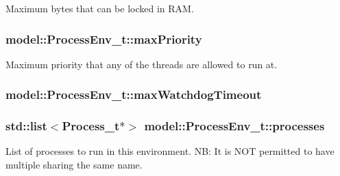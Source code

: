 Maximum bytes that can be locked in R\+AM. 

\subsubsection[{\texorpdfstring{max\+Priority}{maxPriority}}]{ model\+::\+Process\+Env\+\_\+t\+::max\+Priority\hspace{0.3cm}{\ttfamily [private]}}\hypertarget{structmodel_1_1_process_env__t_a87af9ee041287c17fd4ae17db4e319ec}{}\label{structmodel_1_1_process_env__t_a87af9ee041287c17fd4ae17db4e319ec}


Maximum priority that any of the threads are allowed to run at. 

\subsubsection[{\texorpdfstring{max\+Watchdog\+Timeout}{maxWatchdogTimeout}}]{ model\+::\+Process\+Env\+\_\+t\+::max\+Watchdog\+Timeout}\hypertarget{structmodel_1_1_process_env__t_ad9cba2e832253c123b43ff047dd17f40}{}\label{structmodel_1_1_process_env__t_ad9cba2e832253c123b43ff047dd17f40}
\subsubsection[{\texorpdfstring{processes}{processes}}]{\setlength{\rightskip}{0pt plus 5cm}std\+::list$<${\bf Process\+\_\+t}$\ast$$>$ model\+::\+Process\+Env\+\_\+t\+::processes}\hypertarget{structmodel_1_1_process_env__t_aaf3939d50131cc261c01599ed6ba15f8}{}\label{structmodel_1_1_process_env__t_aaf3939d50131cc261c01599ed6ba15f8}
List of processes to run in this environment. NB\+: It is N\+OT permitted to have multiple sharing the same name. 
